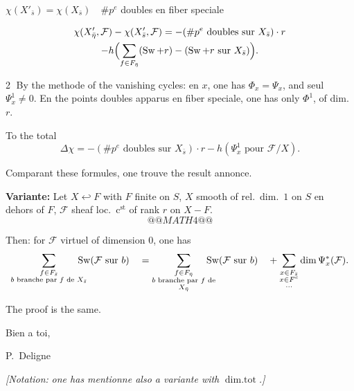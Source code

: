 \documentclass[11pt,a4paper]{article}
\theoremstyle{plain}
\theoremstyle{definition}
\DeclareMathOperator{\Sw}{Sw}
\DeclareMathOperator{\dimtot}{dim.tot}
\begin{document}
$\chi(X'_{\bar{s}}) = \chi(X_{\bar{s}}) \quad \# p^e$ doubles en fiber speciale

\begin{multline*}
\chi(X'_{\bar{\eta}}, \mathcal{F}) - \chi(X'_{\bar{s}}, \mathcal{F}) = -(\# p^e \text{ doubles sur } X_{\bar{s}}) \cdot r \\
- h\Bigl(\sum_{f \in F_{\bar{\eta}}} (\Sw + r) - (\Sw + r \text{ sur } X_{\bar{s}})\Bigr).
\end{multline*}

\textcircled{2} By the methode of the vanishing cycles: en $x$, one has $\Phi_x = \Psi_x$, and seul $\Psi_x^1 \neq 0$. En the points doubles apparus en fiber speciale, one has only $\Phi^1$, of dim.\ $r$.

To the total
\[
\Delta\chi = -(\# p^e \text{ doubles sur } X_{\bar{s}}) \cdot r - h(\Psi_x^1 \text{ pour } \mathcal{F}/X).
\]

Comparant these formules, one trouve the result annonce.

\medskip

\noindent \textbf{Variante:} Let $X \hookleftarrow F$ with $F$ finite on $S$, $X$ smooth of rel.\ dim.\ $1$ on $S$ en dehors of $F$, $\mathcal{F}$ sheaf loc.\ c$^{\text{st}}$ of rank $r$ on $X - F$.
\[
@@MATH4@@
\]

\medskip

Then: for $\mathcal{F}$ virtuel of dimension $0$, one has
\[
\sum_{\substack{f \in F_{\bar{s}} \\ b \text{ branche par } f \text{ de } X_{\bar{s}}}}
\mspace{-20mu}
\Sw(\mathcal{F} \text{ sur } b) \quad
= \sum_{\substack{f \in F_{\bar{\eta}} \\ b \text{ branche par } f \text{ de} \\ X_{\bar{\eta}}}}
\mspace{-20mu}
\Sw(\mathcal{F} \text{ sur } b) \quad
+ \sum_{\substack{x \in F_{\bar{s}} \\ x \in F^c \\ \ldots}} \dim \Psi_x^*(\mathcal{F}).
\]

\medskip

\begin{flushright}
The proof is the same.

\medskip

Bien a toi,

P.~Deligne
\end{flushright}

\vspace{1cm}

\noindent \textit{[Notation:} \textit{one has mentionne also a variante with} $\dimtot$\textit{.]}
\end{document}
